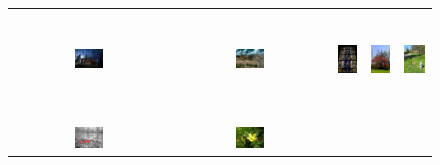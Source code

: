 \documentclass[10pt,journal,compsoc]{IEEEtran}
\begin{document}
\begin{figure}[th]
{\small{
\begin{center}
\begin{tabular}{@{}c@{\,\,\,}c@{\,\,\,}c@{\,\,\,}c@{\,\,\,}c@{\,\,\,}}
\includegraphics[width=0.19\textwidth]{imggrid/falseposi/1.jpg} &
\includegraphics[width=0.19\textwidth]{imggrid/falseposi/2.jpg} &
\includegraphics[height=1in]{imggrid/falseposi/3.jpg} &
\includegraphics[height=1in]{imggrid/falseposi/4.jpg} &
\includegraphics[height=1in]{imggrid/falseposi/5.jpg} \\
\\[-6pt]
\hline
\\[-6pt]
\includegraphics[width=0.19\textwidth]{imggrid/falseposi/6.jpg} &
\includegraphics[width=0.19\textwidth]{imggrid/falseposi/7.jpg} &

\end{tabular}
\end{center}}}
\end{figure}
\end{document}
